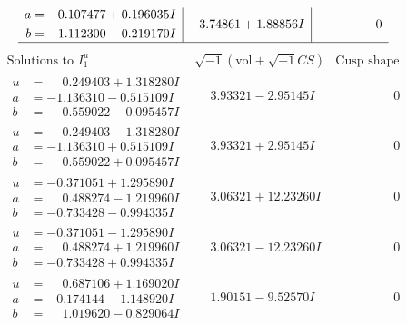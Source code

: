 \documentclass[1p]{elsarticle_modified}
\theoremstyle{definition}
\newcommand{\I}{\sqrt{-1}}
\begin{document}
$$\begin{array}{c|c|c}
\begin{aligned}
a &= -0.107477 + 0.196035 I \\
b &= \phantom{-}1.112300 - 0.219170 I\end{aligned}
 & \phantom{-}3.74861 + 1.88856 I & \phantom{-0.000000 } 0\\
 \hline 
 \end{array}$$\newpage$$\begin{array}{c|c|c}  
\text{Solutions to }I^u_{1}& \I (\text{vol} + \sqrt{-1}CS) & \text{Cusp shape}\\
 \hline 
\begin{aligned}
u &= \phantom{-}0.249403 + 1.318280 I \\
a &= -1.136310 - 0.515109 I \\
b &= \phantom{-}0.559022 - 0.095457 I\end{aligned}
 & \phantom{-}3.93321 - 2.95145 I & \phantom{-0.000000 } 0 \\ \hline\begin{aligned}
u &= \phantom{-}0.249403 - 1.318280 I \\
a &= -1.136310 + 0.515109 I \\
b &= \phantom{-}0.559022 + 0.095457 I\end{aligned}
 & \phantom{-}3.93321 + 2.95145 I & \phantom{-0.000000 } 0 \\ \hline\begin{aligned}
u &= -0.371051 + 1.295890 I \\
a &= \phantom{-}0.488274 - 1.219960 I \\
b &= -0.733428 - 0.994335 I\end{aligned}
 & \phantom{-}3.06321 + 12.23260 I & \phantom{-0.000000 } 0 \\ \hline\begin{aligned}
u &= -0.371051 - 1.295890 I \\
a &= \phantom{-}0.488274 + 1.219960 I \\
b &= -0.733428 + 0.994335 I\end{aligned}
 & \phantom{-}3.06321 - 12.23260 I & \phantom{-0.000000 } 0 \\ \hline\begin{aligned}
u &= \phantom{-}0.687106 + 1.169020 I \\
a &= -0.174144 - 1.148920 I \\
b &= \phantom{-}1.019620 - 0.829064 I\end{aligned}
 & \phantom{-}1.90151 - 9.52570 I & \phantom{-0.000000 } 0 \\ \hline\begin{aligned}

\end{aligned}
\end{array}$$
\end{document}
